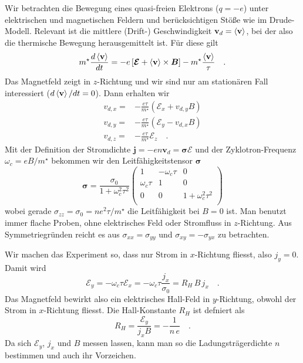 Wir betrachten die Bewegung eines quasi-freien Elektrons ($q=-e$) unter elektrischen und magnetischen Feldern und berücksichtigen Stöße wie im Drude-Modell. Relevant ist die mittlere (Drift-) Geschwindigkeit $\mathbf{v}_d = \braket{\mathbf{v}}$, bei der also die thermische Bewegung herausgemittelt ist. Für diese gilt
\begin{equation}
   m^\star \frac{d \braket{\mathbf{v} }} {dt} = 
   -e \left[ \bm{\mathcal{E}} + \braket{\mathbf{v}} \times \bm{B} \right] 
   - m^\star \frac{\braket{\mathbf{v}}}{\tau} \quad .
\end{equation}
Das Magnetfeld zeigt in $z$-Richtung und wir sind nur am stationären Fall interessiert ($d \braket{\mathbf{v} } / dt = 0$). Dann erhalten wir
\begin{align}
   v_{d,x} =& - \frac{e \tau}{m^\star} ( \mathcal{E}_x + v_{d,y} B ) \\
   v_{d,y} =& - \frac{e \tau}{m^\star} ( \mathcal{E}_y - v_{d,x} B ) \\
   v_{d,z} =& - \frac{e \tau}{m^\star} \mathcal{E}_z  \quad .
\end{align}
Mit der Definition der Stromdichte $\mathbf{j} = - e n \mathbf{v}_d = \bm{\sigma} \bm{\mathcal{E}}$ 
 und der Zyklotron-Frequenz $\omega_c = e B /m^\star$ 
 bekommen wir den Leitfähigkeitstensor $\bm{\sigma}$
\begin{equation}
   \bm{\sigma} = \frac{\sigma_0}{ 1+ \omega_c^2 \tau^2}
   \begin{pmatrix}
      1  & - \omega_c \tau & 0 \\
      \omega_c \tau & 1 & 0  \\
      0 & 0 & 1+ \omega_c^2 \tau^2 \\
   \end{pmatrix} \label{eq:4_sigma_tensor}
\end{equation}
wobei gerade $\sigma_{zz} = \sigma_0 = n e^2 \tau / m^\star $ die Leitfähigkeit bei $B=0$ ist. Man benutzt immer flache Proben, ohne elektrisches Feld oder Stromfluss in $z$-Richtung. Aus Symmetriegründen reicht es aus $\sigma_{xx} = \sigma_{yy}$ und $\sigma_{xy} = - \sigma_{yx}$ zu betrachten. 

Wir machen das Experiment so, dass nur Strom in $x$-Richtung fliesst, also $j_y = 0$. Damit wird 
\begin{equation}
   \mathcal{E}_y = - \omega_c \tau \mathcal{E}_x =  - \omega_c \tau \frac{j_x}{\sigma_0} = R_H \, B \, j_x \quad .
\end{equation}
Das Magnetfeld bewirkt also ein elektrisches Hall-Feld in $y$-Richtung, obwohl der Strom in $x$-Richtung fliesst. Die Hall-Konstante $R_H$ ist defniert als
\begin{equation}
   R_H = \frac{ \mathcal{E}_y }{j_x B} = - \frac{1}{n \, e} \quad .
\end{equation}
Da sich $\mathcal{E}_y$, $j_x$ und $B$ messen lassen, kann man so die Ladungsträgerdichte $n$ bestimmen und auch ihr Vorzeichen. 

